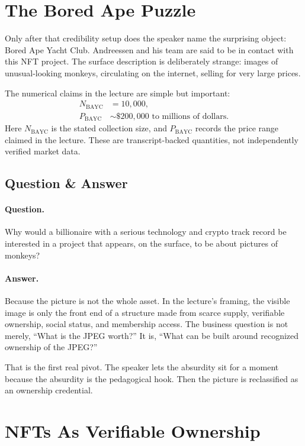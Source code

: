 \section{The Bored Ape Puzzle}

Only after that credibility setup does the speaker name the surprising object: Bored Ape Yacht Club. Andreessen and his team are said to be in contact with this NFT project. The surface description is deliberately strange: images of unusual-looking monkeys, circulating on the internet, selling for very large prices.

The numerical claims in the lecture are simple but important:
\begin{align}
N_{\mathrm{BAYC}} &= 10{,}000, \\
P_{\mathrm{BAYC}} &\sim \$200{,}000 \text{ to millions of dollars}.
\end{align}
Here \(N_{\mathrm{BAYC}}\) is the stated collection size, and \(P_{\mathrm{BAYC}}\) records the price range claimed in the lecture. These are transcript-backed quantities, not independently verified market data.

\subsection{Question \& Answer}

\paragraph{Question.}
Why would a billionaire with a serious technology and crypto track record be interested in a project that appears, on the surface, to be about pictures of monkeys?

\paragraph{Answer.}
Because the picture is not the whole asset. In the lecture's framing, the visible image is only the front end of a structure made from scarce supply, verifiable ownership, social status, and membership access. The business question is not merely, ``What is the JPEG worth?'' It is, ``What can be built around recognized ownership of the JPEG?''

That is the first real pivot. The speaker lets the absurdity sit for a moment because the absurdity is the pedagogical hook. Then the picture is reclassified as an ownership credential.

\section{NFTs As Verifiable Ownership}

